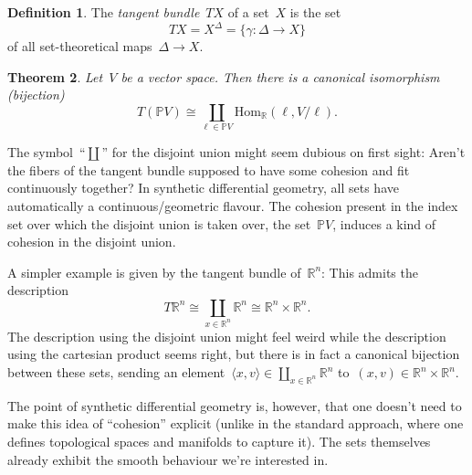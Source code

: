 \documentclass[a4paper,ngerman,12pt]{scrartcl}
\theoremstyle{definition}
\newtheorem{defn}{Definition}
\theoremstyle{plain}
\newtheorem{thm}[defn]{Theorem}
\newcommand{\RR}{\mathbb{R}}
\newcommand{\PP}{\mathbb{P}}
\newcommand{\Hom}{\mathrm{Hom}}
\begin{document}
\begin{defn}The \emph{tangent bundle}~$TX$ of a set~$X$ is the set
\[ TX = X^\Delta = \{ \gamma : \Delta \to X \} \]
of all set-theoretical maps~$\Delta \to X$.\end{defn}
\enlargethispage{4em}\thispagestyle{empty}

\begin{thm}Let~$V$ be a vector space. Then there is a canonical isomorphism
(bijection)
\[ T(\PP V) \cong \coprod_{\ell \in \PP V} \Hom_\RR(\ell,V/\ell). \]
\end{thm}

The symbol~``$\coprod$'' for the disjoint union might seem dubious on first
sight: Aren't the fibers of the tangent bundle supposed to have some cohesion
and fit continuously together? In synthetic differential geometry, all sets
have automatically a continuous/geometric flavour. The cohesion present in the
index set over which the disjoint union is taken over, the set~$\PP V$, induces
a kind of cohesion in the disjoint union.

A simpler example is given by the tangent bundle of~$\RR^n$: This admits the
description
\[ T\RR^n \cong \coprod_{x \in \RR^n} \RR^n \cong \RR^n \times \RR^n. \]
The description using the disjoint union might feel weird while the description
using the cartesian product seems right, but there is in fact a canonical
bijection between these sets, sending an element~$\langle x,v \rangle \in
\coprod_{x \in \RR^n} \RR^n$ to~$(x,v) \in \RR^n \times \RR^n$.

The point of synthetic differential geometry is, however, that one doesn't need
to make this idea of ``cohesion'' explicit (unlike in the standard approach,
where one defines topological spaces and manifolds to capture it). The sets
themselves already exhibit the smooth behaviour we're interested in.
\end{document}
